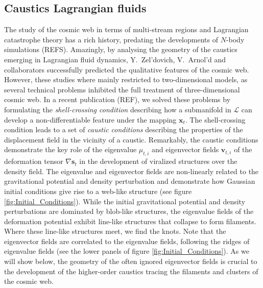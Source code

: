 \documentclass[a4paper, 11pt]{article}
\begin{document}
\subsection{Caustics Lagrangian fluids}
The study of the cosmic web in terms of multi-stream regions and Lagrangian catastrophe theory has a rich history, predating the developments of $N$-body simulations (REFS). Amazingly, by analysing the geometry of the caustics emerging in Lagrangian fluid dynamics, Y.\ Zel'dovich, V.\ Arnol'd and collaborators successfully predicted the qualitative features of the cosmic web. However, these studies where mainly restricted to two-dimensional models, as several technical problems inhibited the full treatment of three-dimensional cosmic web. In a recent publication (REF), we solved these problems by formulating the \textit{shell-crossing condition} describing how a submanifold in $\mathcal{L}$ can develop a non-differentiable feature under the mapping $\bm{x}_t$. The shell-crossing condition leads to a set of \textit{caustic conditions} describing the properties of the displacement field in the vicinity of a caustic. Remarkably, the caustic conditions demonstrate the key role of the eigenvalue $\mu_{t,i}$ and eigenvector fields $\bm{v}_{t,i}$ of the deformation tensor $\nabla \bm{s}_t$ in the development of viralized structures over the density field. The eigenvalue and eigenvector fields are non-linearly related to the gravitational potential and density perturbation and demonstrate how Gaussian initial conditions give rise to a web-like structure (see figure \ref{fig:Initial_Conditions}). While the initial gravitational potential and density perturbations are dominated by blob-like structures, the eigenvalue fields of the deformation potential exhibit line-like structures that collapse to form filaments. Where these line-like structures meet, we find the knots. Note that the eigenvector fields are correlated to the eigenvalue fields, following the ridges of eigenvalue fields (see the lower panels of figure \ref{fig:Initial_Conditions}). As we will show below, the geometry of the often ignored eigenvector fields is crucial to the development of the higher-order caustics tracing the filaments and clusters of the cosmic web.
\end{document}
